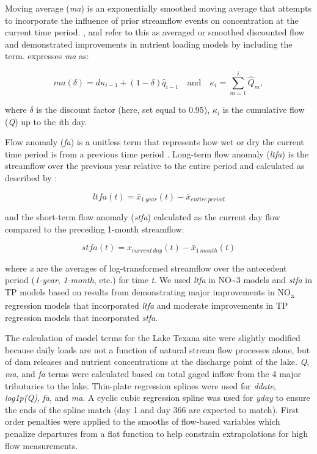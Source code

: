 \documentclass[water,article,submit,oneauthor]{Definitions/mdpi}
\begin{document}
Moving average (\emph{ma}) is an exponentially smoothed moving average
that attempts to incorporate the influence of prior streamflow events on
concentration at the current time period.
\citet{wangLoadEstimationUncertainties2011},
\citet{kuhnert_quantifying_2012} and \citet{zhang_improving_2017} refer
to this as averaged or smoothed discounted flow and demonstrated
improvements in nutrient loading models by including the term.
\citet{kuhnert_quantifying_2012} expresses \emph{ma} as:

\begin{equation}\label{eq:2}
ma(\delta) = d{\kappa_{i-1}}+(1-\delta)\hat{q}_{i-1}\quad\text{and}\quad \kappa_{i}=\sum_{m=1}^{i}\hat{Q}_m,
\end{equation}

where \(\delta\) is the discount factor (here, set equal to 0.95),
\(\kappa_i\) is the cumulative flow (\emph{Q}) up to the \emph{i}th day.

Flow anomaly (\emph{fa}) is a unitless term that represents how wet or
dry the current time period is from a previous time period
\citep{vecchia_trends_2009, zhang_improving_2017}. Long-term flow
anomaly (\emph{ltfa}) is the streamflow over the previous year relative
to the entire period and calculated as described by
\citet{zhang_improving_2017}:

\begin{equation}\label{eq:3}
ltfa(t) = \bar{x}_{1\,year}(t) - \bar{x}_{entire\,period} 
\end{equation}

and the short-term flow anomaly (\emph{stfa}) calculated as the current
day flow compared to the preceding 1-month streamflow:

\begin{equation}\label{eq:4}
stfa(t) = x_{current\,day}(t) - \bar{x}_{1\,month}(t) 
\end{equation}

where \emph{x} are the averages of log-transformed streamflow over the
antecedent period (\emph{1-year}, \emph{1-month}, etc.) for time
\emph{t}. We used \emph{ltfa} in NO\textasciitilde3 models and
\emph{stfa} in TP models based on results from
\citet{zhang_improving_2017} demonstrating major improvements in
NO\textsubscript{x} regression models that incorporated \emph{ltfa} and
moderate improvements in TP regression models that incorporated
\emph{stfa}.

The calculation of model terms for the Lake Texana site were slightly
modified because daily loads are not a function of natural stream flow
processes alone, but of dam releases and nutrient concentrations at the
discharge point of the lake. \emph{Q}, \emph{ma}, and \emph{fa} terms
were calculated based on total gaged inflow from the 4 major tributaries
to the lake. Thin-plate regression splines were used for \emph{ddate},
\emph{log1p(Q)}, \emph{fa}, and \emph{ma}. A cyclic cubic regression
spline was used for \emph{yday} to ensure the ends of the spline match
(day 1 and day 366 are expected to match). First order penalties were
applied to the smooths of flow-based variables which penalize departures
from a flat function to help constrain extrapolations for high flow
measurements.
\end{document}
